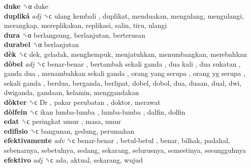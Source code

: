 \textbf{duke} ␝α  duke  \\
\textbf{dupliká} \emph{adj}  ␝ϲ   ulang kembali , duplikat, menduakan, mengulang, mengulangi, merangkap, mereplikakan, replikasi, salin, tiru, ulangi  \\
\textbf{dura} ␝α  berlangsung, berlanjutan, berterusan  \\
\textbf{durabel} ␝α  berlanjutan  \\
\textbf{dèk} ␝ϲ  dek, geladak, menghempuk, menjatuhkan, menumbangkan, merebahkan  \\
\textbf{dòbel} \emph{adj}  ␝ϲ   benar-benar ,  bertambah sekali ganda ,  dua kali ,  dua sukatan ,  ganda dua ,  menambahkan sekali ganda ,  orang yang serupa ,  orang yg serupa ,  sekali ganda , berdua, berganda, berlipat, dobel, dobol, dua, duaan, dual, dwi, dwiganda, gandaan, kelamin, menggandakan  \\
\textbf{dòkter} ␝ϲ   Dr ,  pakar perubatan , doktor, merawat  \\
\textbf{dòlfein} ␝ϲ   ikan lumba-lumba ,  lumba-lumba , dalfin, dolfin  \\
\textbf{edat} ␝ϲ   peringkat umur , masa, umur  \\
\textbf{edifisio} ␝ϲ  bangunan, gedung, perumahan  \\
\textbf{efektivamente} \emph{adv}  ␝ϲ   benar-benar ,  betul-betul , benar, bilhak, padahal, sebenarnya, sebetulnya, sedang, sekarang, selurusnya, semestinya, sesungguhnya  \\
\textbf{efektivo} \emph{adj}  ␝ϲ  ada, aktual, sekarang, wujud  \\
